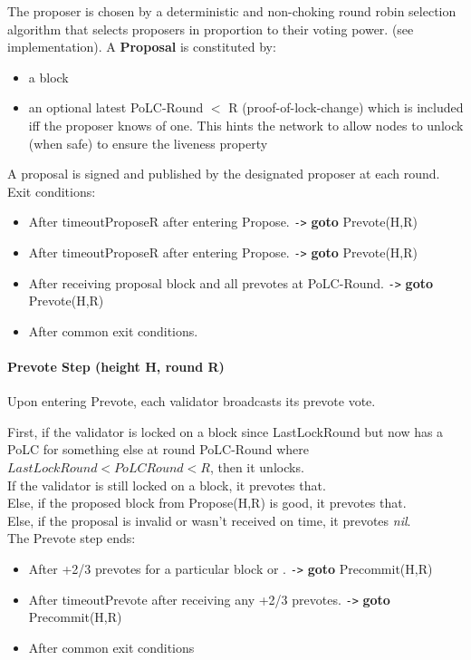 \documentclass[]{article}
\newcommand{\goto}{\texttt{->} \textbf{goto}  }
\begin{document}
The proposer is chosen by a deterministic and non-choking round robin selection algorithm that selects proposers in proportion to their voting power. (see implementation). A \textbf{Proposal} is constituted by:
\begin{itemize}
\item a block
\item an optional latest PoLC-Round $<$ R (proof-of-lock-change) which is included iff the proposer knows of one. This hints the network to allow nodes to unlock (when safe) to ensure the liveness property
\end{itemize}
A proposal is signed and published by the designated proposer at each round.
\\
Exit conditions:
\begin{itemize}
	\item After timeoutProposeR after entering Propose. \goto  Prevote(H,R)
	\item After timeoutProposeR after entering Propose. \goto  Prevote(H,R)
	\item After receiving proposal block and all prevotes at PoLC-Round. \goto Prevote(H,R)
	\item After common exit conditions.
\end{itemize}


\paragraph{Prevote Step (height H, round R)} Upon entering Prevote, each validator broadcasts its prevote vote.

First, if the validator is locked on a block since LastLockRound but now has a PoLC for something else at round PoLC-Round where $LastLockRound < PoLC Round < R$, then it unlocks.\\
If the validator is still locked on a block, it prevotes that.\\
Else, if the proposed block from Propose(H,R) is good, it prevotes that.\\
Else, if the proposal is invalid or wasn’t received on time, it prevotes \textit{nil}.\\

The Prevote step ends:
\begin{itemize}
\item After +2/3 prevotes for a particular block or . \goto Precommit(H,R)
\item After timeoutPrevote after receiving any +2/3 prevotes. \goto Precommit(H,R)
\item After common exit conditions
\end{itemize}
\end{document}
